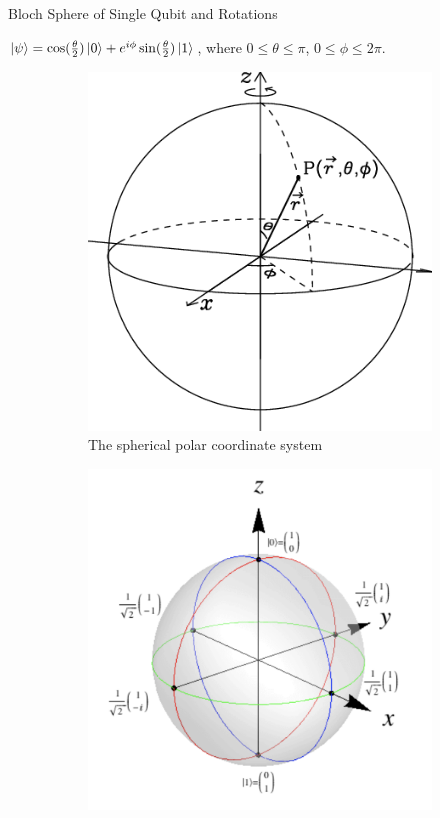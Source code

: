 \documentclass{beamer}
\begin{document}
\begin{frame}{Bloch Sphere of Single Qubit and Rotations}
  {\tiny
    $\ket{\psi} = \cos(\frac{\theta}2)\ket{0}+e^{i\phi}\sin(\frac{\theta}2)\ket{1}$, where $0\leqslant\theta\leqslant\pi$, $0\leqslant\phi\leqslant2\pi$.
    \begin{figure}
      \centering
      \begin{subfigure}[b]{0.5\textwidth}
        \centering
        \includegraphics[scale=0.1]{figures/The-spherical-polar-coordinate-system}
        \caption{The spherical polar coordinate system\tiny\cite{sphericalpolarcoordinate}}
      \end{subfigure}
      \hfill
      \begin{subfigure}[b]{0.5\textwidth}
        \centering
        \includegraphics[scale=0.12]{figures/singlequbitstates}

\end{subfigure}
\end{figure}}
\end{frame}
\end{document}
